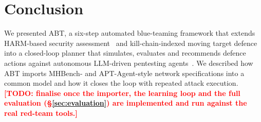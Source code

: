 \documentclass[conference]{IEEEtran}
\newcommand{\todo}[1]{\textcolor{red}{\textbf{[TODO: #1]}}}
\begin{document}
\section{Conclusion}
\label{sec:conclusion}

We presented ABT, a six-step automated blue-teaming framework that extends HARM-based
security assessment~\cite{harmer2020,maritime2021} and kill-chain-indexed moving
target defence~\cite{mtdindepth2026} into a closed-loop planner that simulates,
evaluates and recommends defence actions against autonomous LLM-driven pentesting
agents~\cite{incalmo2025,aptagent2026}. We described how ABT imports MHBench- and
APT-Agent-style network specifications into a common model and how it closes the
loop with repeated attack execution. \todo{finalise once the importer, the learning
loop and the full evaluation (\S\ref{sec:evaluation}) are implemented and run against
the real red-team tools.}


{\sloppy

}
\end{document}
